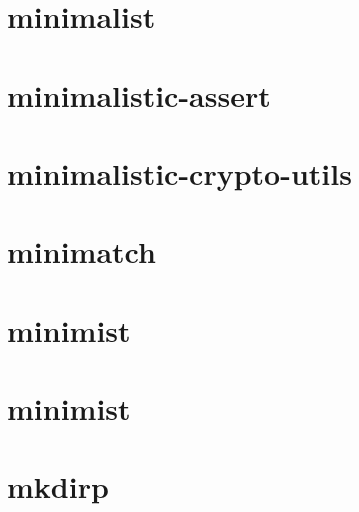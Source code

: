 \documentclass[twoside]{book}
\newcommand{\+}{\discretionary{\mbox{\scriptsize$\hookleftarrow$}}{}{}}
\begin{document}
\chapter{minimalist}
\label{md_dsmacc_examples_DRmerge_node_modules_minimalist_README}

\chapter{minimalistic-\/assert}
\label{md_dsmacc_examples_DRmerge_node_modules_minimalistic-assert_readme}

\chapter{minimalistic-\/crypto-\/utils}
\label{md_dsmacc_examples_DRmerge_node_modules_minimalistic-crypto-utils_README}

\chapter{minimatch}
\label{md_dsmacc_examples_DRmerge_node_modules_minimatch_README}

\chapter{minimist}
\label{md_dsmacc_examples_DRmerge_node_modules_minimist_readme}

\chapter{minimist}
\label{md_dsmacc_examples_DRmerge_node_modules_mkdirp_node_modules_minimist_readme}

\chapter{mkdirp}
\label{md_dsmacc_examples_DRmerge_node_modules_mkdirp_readme}

\end{document}
